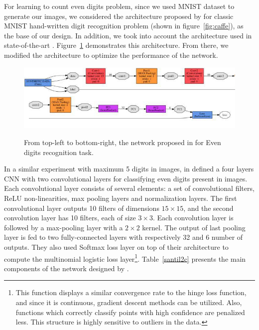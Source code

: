 For learning to count even digits problem, since we used MNIST dataset to generate our images, we considered the architecture proposed by \citeauthor{lecun1995comparison} for classic MNIST hand-written digit recognition problem \cite{lecun1995comparison} (shown in figure~\ref{fig:caffe}), as the base of our design. In addition, we took into account the architecture used in state-of-the-art \cite{segui2015learning}. Figure~\ref{santil2cfull} demonstrates this architecture. From there, we modified the architecture to optimize the performance of the network. 
 
\begin{figure}[H]
  \centering
   {\includegraphics[width=1.\textwidth]{images/santil2cfull}}
	\caption{From top-left to bottom-right, the network proposed in \cite{segui2015learning} for Even digits recognition task.}
	\label{santil2cfull}
\end{figure}

\noindent In a similar experiment with maximum 5 digits in images, \citeauthor{segui2015learning} in \cite{segui2015learning} defined a four layers CNN with two convolutional layers for classifying even digits present in images. Each convolutional layer consists of several elements: a set of convolutional filters, ReLU non-linearities, max pooling layers and normalization layers. The first convolutional layer outputs 10 filters of dimensions $15\times15$, and the second convolution layer has 10 filters, each of size $3\times3$. Each convolution layer is followed by a max-pooling layer with a $2\times2$ kernel. The output of last pooling layer is fed to two fully-connected layers with respectively 32 and 6 number of outputs. They also used Softmax loss layer on top of their architecture to compute the multinomial logistic loss layer\footnote{This function displays a similar convergence rate to the hinge loss function, and since it is continuous, gradient descent methods can be utilized. Also, functions which correctly classify points with high confidence are penalized less. This structure is highly sensitive to outliers in the data.}. Table~\ref{santil2c} presents the main components of the network designed by \cite{segui2015learning}. 

